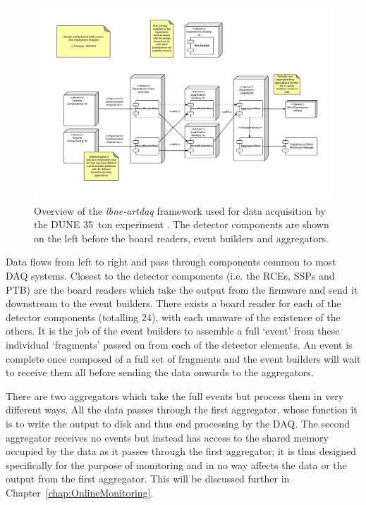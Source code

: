 \begin{figure}
\centering
  \includegraphics[width=16cm]{artdaqFramework.pdf}
  \caption[Overview of the \textit{lbne-artdaq} framework used for data acquisition by the DUNE 35~ton experiment.]{Overview of the \textit{lbne-artdaq} framework used for data acquisition by the DUNE 35~ton experiment \cite{Freeman2014}.  The detector components are shown on the left before the board readers, event builders and aggregators.}
  \label{fig:lbne-artdaq}
\end{figure}

Data flows from left to right and pass through components common to most DAQ systems.  Closest to the detector components (i.e. the RCEs, SSPs and PTB) are the board readers which take the output from the firmware and send it downstream to the event builders.  There exists a board reader for each of the detector components (totalling 24), with each unaware of the existence of the others.  It is the job of the event builders to assemble a full `event' from these individual `fragments' passed on from each of the detector elements.  An event is complete once composed of a full set of fragments and the event builders will wait to receive them all before sending the data onwards to the aggregators.

There are two aggregators which take the full events but process them in very different ways.  All the data passes through the first aggregator, whose function it is to write the output to disk and thus end processing by the DAQ.  The second aggregator receives no events but instead has access to the shared memory occupied by the data as it passes through the first aggregator; it is thus designed specifically for the purpose of monitoring and in no way affects the data or the output from the first aggregator.  This will be discussed further in Chapter~\ref{chap:OnlineMonitoring}.

